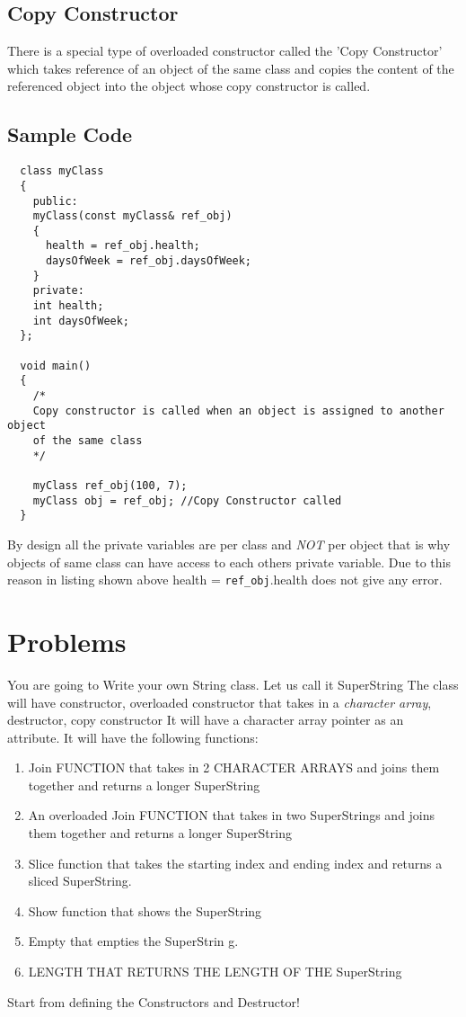 \documentclass[11pt,fleqn]{book} %
\begin{document}
\subsection{Copy Constructor}
There is a special type of overloaded constructor called the 'Copy Constructor' which takes reference of an object of the same class and copies the content of the referenced object into the object whose copy constructor is called.
\subsection{Sample Code}
\begin{lstlisting}
  class myClass
  {
    public:
    myClass(const myClass& ref_obj)
    {
      health = ref_obj.health;
      daysOfWeek = ref_obj.daysOfWeek;
    }
    private:
    int health;
    int daysOfWeek;
  };
  
  void main()
  {
    /*
    Copy constructor is called when an object is assigned to another object 
    of the same class
    */
    
    myClass ref_obj(100, 7);
    myClass obj = ref_obj; //Copy Constructor called
  }
\end{lstlisting}
\begin{tcolorbox}[width=\textwidth,colback={white},title={KEYNOTE},colbacktitle=purple!50!white,coltitle=black]
  By design all the private variables are per class and \emph{NOT}  per object that is why objects of same class can have access to each others private variable. Due to this reason in listing shown above health = \texttt{ref\_obj}.health does not give any error.
  
\end{tcolorbox}

\section{Problems}
You are going to Write your own String class. Let us call it SuperString
The class will have constructor, overloaded constructor that takes in a \emph{character array}, destructor, copy constructor
It will have a character array pointer as an attribute.
It will have the following functions:\\
\begin{enumerate}
\item Join FUNCTION that takes in 2 CHARACTER ARRAYS and joins them together and returns a longer SuperString
\item An overloaded Join FUNCTION that takes in two SuperStrings and joins them together and returns a longer SuperString
\item Slice function that takes the starting index and ending index and returns a sliced SuperString.
\item Show function that shows the SuperString
\item Empty that empties the SuperStrin g.
\item LENGTH THAT RETURNS THE LENGTH OF THE SuperString
\end{enumerate}
\hfill \break
Start from defining the Constructors and Destructor!
\end{document}
